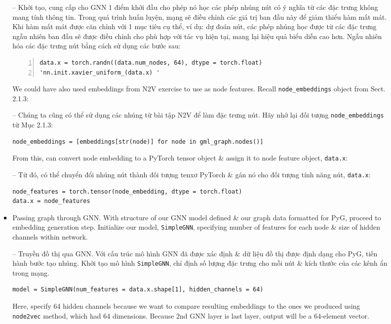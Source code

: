 \documentclass{article}
\begin{document}
\begin{itemize}
\begin{itemize}
\begin{itemize}
\begin{itemize}
               -- Khởi tạo, cung cấp cho GNN 1 điểm khởi đầu cho phép nó học các phép nhúng nút có ý nghĩa từ các đặc trưng không mang tính thông tin. Trong quá trình huấn luyện, mạng sẽ điều chỉnh các giá trị ban đầu này để giảm thiểu hàm mất mát. Khi hàm mất mát được căn chỉnh với 1 mục tiêu cụ thể, ví dụ: dự đoán nút, các phép nhúng học được từ các đặc trưng ngẫu nhiên ban đầu sẽ được điều chỉnh cho phù hợp với tác vụ hiện tại, mang lại hiệu quả biểu diễn cao hơn. Ngẫu nhiên hóa các đặc trưng nút bằng cách sử dụng các bước sau:
               \begin{Verbatim}[numbers=left,xleftmargin=5mm]
data.x = torch.randn((data.num_nodes, 64), dtype = torch.float)
'nn.init.xavier_uniform_(data.x) '
               \end{Verbatim}
               We could have also used embeddings from N2V exercise to use as node features. Recall \verb|node_embeddings| object from Sect. 2.1.3:

               -- Chúng ta cũng có thể sử dụng các nhúng từ bài tập N2V để làm đặc trưng nút. Hãy nhớ lại đối tượng \verb|node_embeddings| từ Mục 2.1.3:
               \begin{verbatim}
node_embeddings = [embeddings[str(node)] for node in gml_graph.nodes()]
               \end{verbatim}
               From this, can convert node embedding to a PyTorch tensor object \& assign it to node feature object, {\tt data.x}:

               -- Từ đó, có thể chuyển đổi nhúng nút thành đối tượng tenxơ PyTorch \& gán nó cho đối tượng tính năng nút, {\tt data.x}:
               \begin{verbatim}
node_features = torch.tensor(node_embedding, dtype = torch.float)
data.x = node_features
               \end{verbatim}
               \item {\sf Passing graph through GNN.} With structure of our GNN model defined \& our graph data formatted for PyG, proceed to embedding generation step. Initialize our model, {\tt SimpleGNN}, specifying number of features for each node \& size of hidden channels within network.

               -- {\sf Truyền đồ thị qua GNN.} Với cấu trúc mô hình GNN đã được xác định \& dữ liệu đồ thị được định dạng cho PyG, tiến hành bước tạo nhúng. Khởi tạo mô hình {\tt SimpleGNN}, chỉ định số lượng đặc trưng cho mỗi nút \& kích thước của các kênh ẩn trong mạng.
               \begin{verbatim}
model = SimpleGNN(num_features = data.x.shape[1], hidden_channels = 64)
               \end{verbatim}
               Here, specify 64 hidden channels because we want to compare resulting embeddings to the ones we produced using {\tt node2vec} method, which had 64 dimensions. Because 2nd GNN layer is last layer, output will be a 64-element vector.


\end{itemize}
\end{itemize}
\end{itemize}
\end{itemize}
\end{document}
